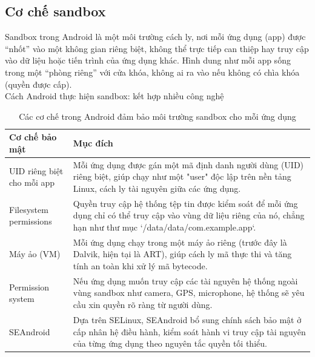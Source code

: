 \subsection{Cơ chế sandbox}
\renewcommand{\labelitemi}{--}    
    \begin{flushleft}
        \hspace*{0.8cm}Sandbox trong Android là một môi trường cách ly, nơi mỗi ứng dụng (app) được “nhốt” vào một không gian riêng biệt, không thể trực tiếp can thiệp hay truy cập vào dữ liệu hoặc tiến trình của ứng dụng khác. Hình dung như mỗi app sống trong một “phòng riêng” với cửa khóa, không ai ra vào nếu không có chìa khóa (quyền được cấp)\cite{app-sandbox}.\\
        \setlength{\leftmargini}{1.5cm}
        \hspace*{0.8cm}Cách Android thực hiện sandbox: kết hợp nhiều công nghệ
        \begin{table}[H]
            \centering
            \renewcommand{\arraystretch}{1.5}
            \begin{tabular}{|p{4.5cm}|p{11cm}|}
                \hline
                \textbf{Cơ chế bảo mật} & \textbf{Mục đích} \\
                \hline
                UID riêng biệt cho mỗi app & Mỗi ứng dụng được gán một mã định danh người dùng (UID) riêng biệt, giúp chạy như một "user" độc lập trên nền tảng Linux, cách ly tài nguyên giữa các ứng dụng. \\
                \hline
                Filesystem permissions & Quyền truy cập hệ thống tệp tin được kiểm soát để mỗi ứng dụng chỉ có thể truy cập vào vùng dữ liệu riêng của nó, chẳng hạn như thư mục `/data/data/com.example.app`. \\
                \hline
                Máy ảo (VM) & Mỗi ứng dụng chạy trong một máy ảo riêng (trước đây là Dalvik, hiện tại là ART), giúp cách ly mã thực thi và tăng tính an toàn khi xử lý mã bytecode. \\
                \hline
                Permission system & Nếu ứng dụng muốn truy cập các tài nguyên hệ thống ngoài vùng sandbox như camera, GPS, microphone, hệ thống sẽ yêu cầu xin quyền rõ ràng từ người dùng. \\
                \hline
                SEAndroid & Dựa trên SELinux, SEAndroid bổ sung chính sách bảo mật ở cấp nhân hệ điều hành, kiểm soát hành vi truy cập tài nguyên của từng ứng dụng theo nguyên tắc quyền tối thiểu\cite{Android-Security-Overview}. \\
                \hline
            \end{tabular}
            \caption{Các cơ chế trong Android đảm bảo môi trường sandbox cho mỗi ứng dụng}
            \label{table:android-sandbox-mechanisms}
            \end{table}
            
    \end{flushleft}
